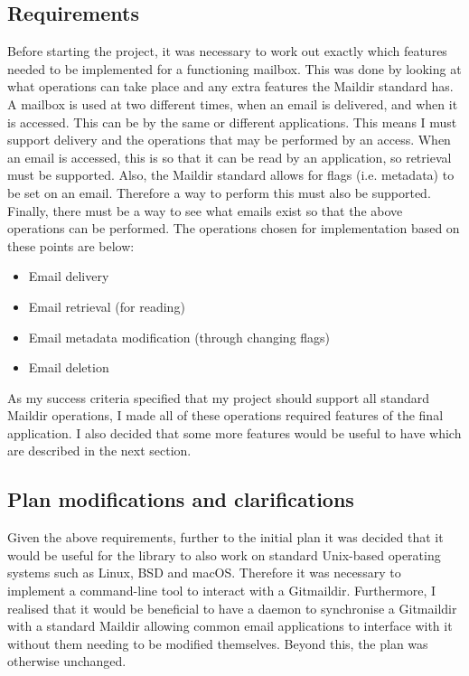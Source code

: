 \subsection{Requirements}

Before starting the project, it was necessary to work out exactly which features needed to be implemented for a functioning mailbox. This was done by looking at what operations can take place and any extra features the Maildir standard has. A mailbox is used at two different times, when an email is delivered, and when it is accessed. This can be by the same or different applications. This means I must support delivery and the operations that may be performed by an access. When an email is accessed, this is so that it can be read by an application, so retrieval must be supported. Also, the Maildir standard allows for flags (i.e. metadata) to be set on an email. Therefore a way to perform this must also be supported. Finally, there must be a way to see what emails exist so that the above operations can be performed. The operations chosen for implementation based on these points are below:

\begin{itemize}
  \item Email delivery
  \item Email retrieval (for reading)
  \item Email metadata modification (through changing flags)
  \item Email deletion
\end{itemize}

As my success criteria specified that my project should support all standard Maildir operations, I made all of these operations required features of the final application. I also decided that some more features would be useful to have which are described in the next section.

\subsection{Plan modifications and clarifications}

Given the above requirements, further to the initial plan it was decided that it would be useful for the library to also work on standard Unix-based operating systems such as Linux, BSD and macOS. Therefore it was necessary to implement a command-line tool to interact with a Gitmaildir. Furthermore, I realised that it would be beneficial to have a daemon to synchronise a Gitmaildir with a standard Maildir allowing common email applications to interface with it without them needing to be modified themselves. Beyond this, the plan was otherwise unchanged.

